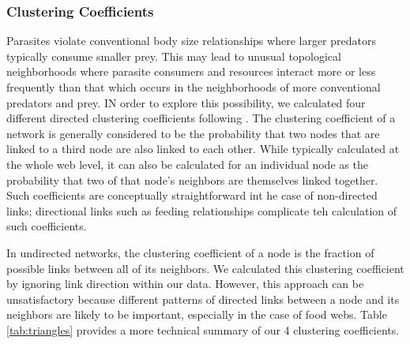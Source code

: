 \documentclass[../dissertation.tex]{subfiles}
\begin{document}
\subsubsection{Clustering Coefficients}
Parasites violate conventional body size relationships where larger predators
typically consume smaller prey. This may lead to unusual topological
neighborhoods where parasite consumers and resources interact more or less
frequently than that which occurs in the neighborhoods of more conventional
predators and prey. IN order to explore this possibility, we calculated four
different directed clustering coefficients following \cite{Fagiolo2006}.
The clustering coefficient of a network is generally considered to be the
probability that two nodes that are linked to a third node are also linked to
each other. While typically calculated at the whole web level, it can also be
calculated for an individual node as the probability that two of that node's
neighbors are themselves linked together. Such coefficients are conceptually
straightforward int he case of non-directed links; directional links such as
feeding relationships complicate teh calculation of such coefficients.


In undirected networks, the clustering coefficient of a node is the fraction of
possible links between all of its neighbors. We calculated this clustering
coefficient by ignoring link direction within our data. However, this approach
can be unsatisfactory because different patterns of directed links between a
node and its neighbors are likely to be important, especially in the case of
food webs. Table \ref{tab:triangles} provides a more technical summary of our 4
clustering coefficients.
\end{document}
